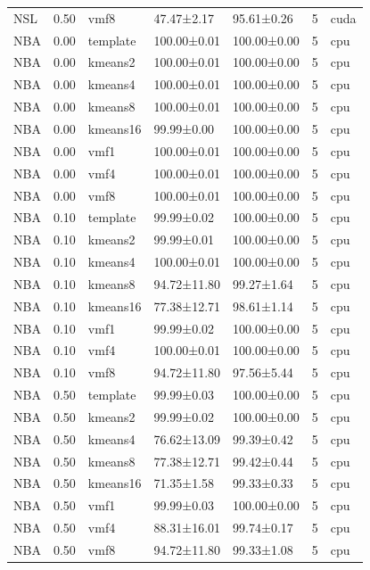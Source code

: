 \begin{tabular}{lrlllrl}
NSL & 0.50 & vmf8 & 47.47±2.17 & 95.61±0.26 & 5 & cuda \\
NBA & 0.00 & template & 100.00±0.01 & 100.00±0.00 & 5 & cpu \\
NBA & 0.00 & kmeans2 & 100.00±0.01 & 100.00±0.00 & 5 & cpu \\
NBA & 0.00 & kmeans4 & 100.00±0.01 & 100.00±0.00 & 5 & cpu \\
NBA & 0.00 & kmeans8 & 100.00±0.01 & 100.00±0.00 & 5 & cpu \\
NBA & 0.00 & kmeans16 & 99.99±0.00 & 100.00±0.00 & 5 & cpu \\
NBA & 0.00 & vmf1 & 100.00±0.01 & 100.00±0.00 & 5 & cpu \\
NBA & 0.00 & vmf4 & 100.00±0.01 & 100.00±0.00 & 5 & cpu \\
NBA & 0.00 & vmf8 & 100.00±0.01 & 100.00±0.00 & 5 & cpu \\
NBA & 0.10 & template & 99.99±0.02 & 100.00±0.00 & 5 & cpu \\
NBA & 0.10 & kmeans2 & 99.99±0.01 & 100.00±0.00 & 5 & cpu \\
NBA & 0.10 & kmeans4 & 100.00±0.01 & 100.00±0.00 & 5 & cpu \\
NBA & 0.10 & kmeans8 & 94.72±11.80 & 99.27±1.64 & 5 & cpu \\
NBA & 0.10 & kmeans16 & 77.38±12.71 & 98.61±1.14 & 5 & cpu \\
NBA & 0.10 & vmf1 & 99.99±0.02 & 100.00±0.00 & 5 & cpu \\
NBA & 0.10 & vmf4 & 100.00±0.01 & 100.00±0.00 & 5 & cpu \\
NBA & 0.10 & vmf8 & 94.72±11.80 & 97.56±5.44 & 5 & cpu \\
NBA & 0.50 & template & 99.99±0.03 & 100.00±0.00 & 5 & cpu \\
NBA & 0.50 & kmeans2 & 99.99±0.02 & 100.00±0.00 & 5 & cpu \\
NBA & 0.50 & kmeans4 & 76.62±13.09 & 99.39±0.42 & 5 & cpu \\
NBA & 0.50 & kmeans8 & 77.38±12.71 & 99.42±0.44 & 5 & cpu \\
NBA & 0.50 & kmeans16 & 71.35±1.58 & 99.33±0.33 & 5 & cpu \\
NBA & 0.50 & vmf1 & 99.99±0.03 & 100.00±0.00 & 5 & cpu \\
NBA & 0.50 & vmf4 & 88.31±16.01 & 99.74±0.17 & 5 & cpu \\
NBA & 0.50 & vmf8 & 94.72±11.80 & 99.33±1.08 & 5 & cpu \\
\bottomrule
\end{tabular}
